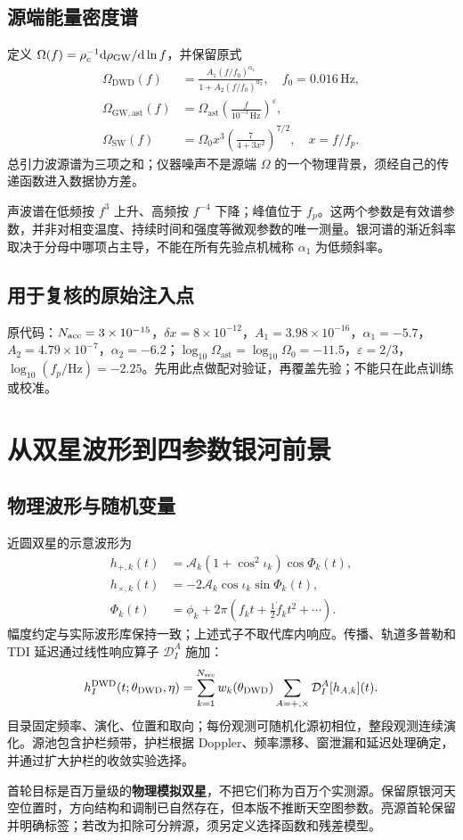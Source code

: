 \documentclass[UTF8,fontset=none,a4paper,11pt]{ctexart}
\newcommand{\dd}{\mathrm d}\newcommand{\GB}{\mathrm{DWD}}\newcommand{\AST}{\mathrm{ast}}\newcommand{\SW}{\mathrm{SW}}
\newcommand{\chapterpage}[1]{\section{#1}}
\begin{document}
\subsection{源端能量密度谱}
定义 $\Omega(f)=\rho_c^{-1}\dd\rho_{\rm GW}/\dd\ln f$，并保留原式
\begin{align}
\Omega_{\GB}(f)&=\frac{A_1(f/f_0)^{\alpha_1}}{1+A_2(f/f_0)^{\alpha_2}},\quad f_0=0.016\,\mathrm{Hz},\\
\Omega_{\mathrm{GW,ast}}(f)&=\Omega_{\AST}\left(\frac{f}{10^{-3}\,\mathrm{Hz}}\right)^{\varepsilon},\\
\Omega_{\SW}(f)&=\Omega_0 x^3\left(\frac{7}{4+3x^2}\right)^{7/2},\quad x=f/f_p.
\end{align}
总引力波源谱为三项之和；仪器噪声不是源端 $\Omega$ 的一个物理背景，须经自己的传递函数进入数据协方差。
\par 声波谱在低频按 $f^3$ 上升、高频按 $f^{-4}$ 下降；峰值位于 $f_p$。这两个参数是有效谱参数，并非对相变温度、持续时间和强度等微观参数的唯一测量。银河谱的渐近斜率取决于分母中哪项占主导，不能在所有先验点机械称 $\alpha_1$ 为低频斜率。
\subsection{用于复核的原始注入点}
原代码：$N_{\rm acc}=3\times10^{-15}$，$\delta x=8\times10^{-12}$，$A_1=3.98\times10^{-16}$，$\alpha_1=-5.7$，$A_2=4.79\times10^{-7}$，$\alpha_2=-6.2$；$\log_{10}\Omega_{\AST}=\log_{10}\Omega_0=-11.5$，$\varepsilon=2/3$，$\log_{10}(f_p/\mathrm{Hz})=-2.25$。先用此点做配对验证，再覆盖先验；不能只在此点训练或校准。
\chapterpage{从双星波形到四参数银河前景}
\subsection{物理波形与随机变量}
近圆双星的示意波形为
\begin{align}
h_{+,k}(t)&=\mathcal A_k(1+\cos^2\iota_k)\cos\Phi_k(t),\\
h_{\times,k}(t)&=-2\mathcal A_k\cos\iota_k\sin\Phi_k(t),\\
\Phi_k(t)&=\phi_k+2\pi\left(f_k t+\tfrac12\dot f_k t^2+\cdots\right).
\end{align}
幅度约定与实际波形库保持一致；上述式子不取代库内响应。传播、轨道多普勒和 TDI 延迟通过线性响应算子 $\mathcal D_I^A$ 施加：
\begin{equation}
h_I^{\GB}(t;\theta_{\GB},\eta)=\sum_{k=1}^{N_{\rm src}}w_k(\theta_{\GB})\sum_{A=+,\times}\mathcal D_I^A[h_{A,k}](t).
\end{equation}
目录固定频率、演化、位置和取向；每份观测可随机化源初相位，整段观测连续演化。源池包含护栏频带，护栏根据 Doppler、频率漂移、窗泄漏和延迟处理确定，并通过扩大护栏的收敛实验选择。
\par 首轮目标是百万量级的\textbf{物理模拟双星}，不把它们称为百万个实测源。保留原银河天空位置时，方向结构和调制已自然存在，但本版不推断天空图参数。亮源首轮保留并明确标签；若改为扣除可分辨源，须另定义选择函数和残差模型。
\end{document}
